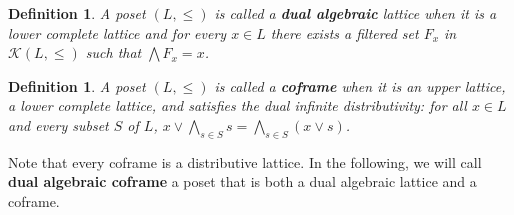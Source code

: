 \documentclass{article}
\newtheorem{definition}[theorem]{Definition}
\newtheorem{remark}[theorem]{Remark}
\begin{document}
\begin{definition}
    A poset $(L,\le)$ is called a \textbf{dual algebraic} lattice when it is a lower complete lattice and for every $x \in L$ there exists a filtered set $F_x$ in $\mathcal{K}(L,\le)$ such that $\bigwedge F_x = x$.
\end{definition}

\begin{definition}
    {A poset $(L,\le)$ is called a \textbf{coframe} when it is an upper lattice, a lower complete lattice, and satisfies the dual infinite distributivity: for all $x \in L$ and every subset $S$ of $L$, $x \vee  \bigwedge_{s \in S} s = \bigwedge_{s \in S} (x \vee s)$.}
\end{definition}

{Note that every coframe is a distributive lattice.}
{In the following, we will call \textbf{dual algebraic coframe} a poset that is both a dual algebraic lattice and a coframe.}
\end{document}
